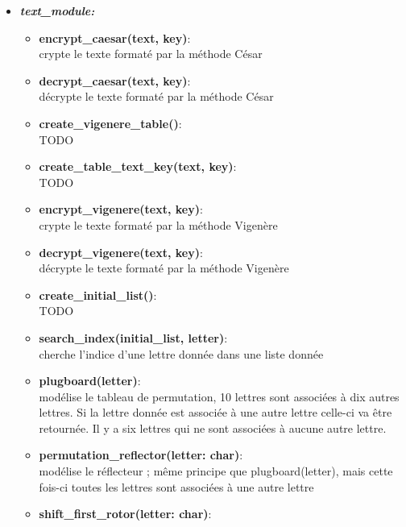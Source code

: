 \documentclass[a4paper,12pt,abstracton,titlepage]{scrartcl}
\begin{document}
\begin{itemize}
\item \textit{\textbf{text\_module:}}\vspace{0.2cm}
\begin{itemize}
\item \textbf{encrypt\_caesar(text, key)}:\\
crypte le texte formaté par la méthode César\\
\item \textbf{decrypt\_caesar(text, key)}:\\
décrypte le texte formaté par la méthode César\\
\item \textbf{create\_vigenere\_table()}:\\
TODO\\
\item \textbf{create\_table\_text\_key(text, key)}:\\
TODO\\
\item \textbf{encrypt\_vigenere(text, key)}:\\
crypte le texte formaté par la méthode Vigenère\\
\item \textbf{decrypt\_vigenere(text, key)}:\\
décrypte le texte formaté par la méthode Vigenère\\
\item \textbf{create\_initial\_list()}:\\
TODO\\
\item \textbf{search\_index(initial\_list, letter)}:\\
cherche l'indice d'une lettre donnée dans une liste donnée\\
\item \textbf{plugboard(letter)}:\\
modélise le tableau de permutation, 10 lettres sont associées à dix autres lettres. Si la lettre donnée est associée à une autre lettre celle-ci va être retournée. Il y a six lettres qui ne sont associées à aucune autre lettre.\\
\item \textbf{permutation\_reflector(letter: char)}:\\
modélise le réflecteur ; même principe que plugboard(letter), mais cette fois-ci toutes les lettres sont associées à une autre lettre\\
\item \textbf{shift\_first\_rotor(letter: char)}:\\

\end{itemize}
\end{itemize}
\end{document}
